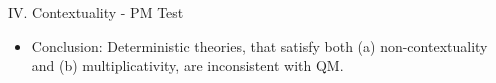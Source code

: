 \documentclass[final,hyperref={pdfpagelabels=false}]{beamer}
\begin{document}
\begin{frame}[t]
\begin{columns}[c]
\begin{column}{.69\textwidth}
\begin{columns}[c]
\begin{column}{.46\textwidth}
\begin{block}{IV. Contextuality - PM Test}
\begin{itemize}
            \item Conclusion: Deterministic theories, that satisfy both (a) non-contextuality and (b) multiplicativity, are inconsistent with QM.
            \end{itemize}

          \end{block}

        \end{column}

        \begin{column}{.015\textwidth}\end{column} %
      \end{columns}






      \begin{columns}[c]

        \begin{column}{.005\textwidth}\end{column} %
        \begin{column}{.94\textwidth} %


\end{column}
\end{columns}
\end{column}
\end{columns}
\end{frame}
\end{document}
